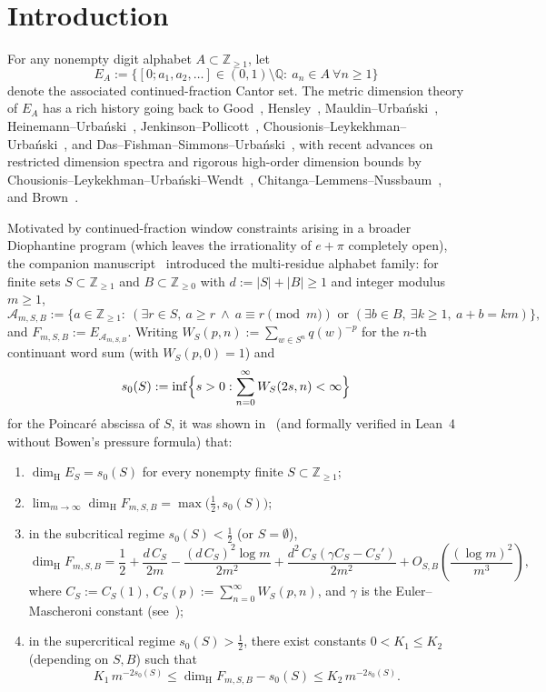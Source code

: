 \documentclass[11pt]{article}
\theoremstyle{definition}
\theoremstyle{remark}
\newcommand{\Z}{\mathbb{Z}}
\newcommand{\Q}{\mathbb{Q}}
\newcommand{\dimH}{\dim_{\mathrm{H}}}
\begin{document}
\section{Introduction}\label{sec:intro}

For any nonempty digit alphabet $A\subset\Z_{\ge1}$, let
\[
E_A:=\bigl\{[0;a_1,a_2,\dots]\in(0,1)\setminus\Q:\ a_n\in A\ \forall n\ge1\bigr\}
\]
denote the associated continued-fraction Cantor set. The metric dimension
theory of $E_A$ has a rich history going back to Good~\cite{Good41},
Hensley~\cite{Hensley92,Hensley1996}, Mauldin--Urba\'nski~\cite{MU96,MU99},
Heinemann--Urba\'nski~\cite{HU02}, Jenkinson--Pollicott~\cite{JP2018},
Chousionis--Leykekhman--Urba\'nski~\cite{CLU}, and
Das--Fishman--Simmons--Urba\'nski~\cite{DFSU}, with recent advances on
restricted dimension spectra and rigorous high-order dimension bounds by
Chousionis--Leykekhman--Urba\'nski--Wendt~\cite{CLUW2024},
Chitanga--Lemmens--Nussbaum~\cite{CLN2026}, and Brown~\cite{Brown2026}.

Motivated by continued-fraction window constraints arising in a broader
Diophantine program (which leaves the irrationality of $e+\pi$ completely
open), the companion manuscript~\cite{Paper2} introduced the multi-residue
alphabet family: for finite sets $S\subset\Z_{\ge1}$ and $B\subset\Z_{\ge0}$
with $d:=|S|+|B|\ge1$ and integer modulus $m\ge1$,
\begin{equation}\label{eq:multi-alphabet}
\mathcal A_{m,S,B}:=\bigl\{a\in\Z_{\ge1}:\ (\exists r\in S,\ a\ge r\ \wedge\ a\equiv r\!\!\pmod m)\text{ or }(\exists b\in B,\ \exists k\ge1,\ a+b=km)\bigr\},
\end{equation}
and $F_{m,S,B}:=E_{\mathcal A_{m,S,B}}$. Writing $W_S(p,n):=\sum_{w\in S^n}q(w)^{-p}$
for the $n$-th continuant word sum (with $W_S(p,0)=1$) and
\[
s_0(S):=\inf\Bigl\{s>0:\sum_{n=0}^\infty W_S(2s,n)<\infty\Bigr\}
\]
for the Poincar\'e abscissa of $S$, it was shown in~\cite{Paper2} (and
formally verified in Lean~4 without Bowen's pressure formula) that:
\begin{enumerate}[label=\textup{(\alph*)},leftmargin=2.2em]
\item $\dimH E_S=s_0(S)$ for every nonempty finite $S\subset\Z_{\ge1}$;
\item $\lim_{m\to\infty}\dimH F_{m,S,B}=\max\bigl(\tfrac12,s_0(S)\bigr)$;
\item in the subcritical regime $s_0(S)<\tfrac12$ (or $S=\emptyset$),
\[
\dimH F_{m,S,B}=\frac12+\frac{d\,C_S}{2m}-\frac{(d\,C_S)^2\log m}{2m^2}
+\frac{d^2\,C_S(\gamma C_S-C_S')}{2m^2}+O_{S,B}\!\left(\frac{(\log m)^2}{m^3}\right),
\]
where $C_S:=C_S(1)$, $C_S(p):=\sum_{n=0}^\infty W_S(p,n)$, and $\gamma$ is the
Euler--Mascheroni constant (see~\cite{DLMF});
\item in the supercritical regime $s_0(S)>\tfrac12$, there exist constants
$0<K_1\le K_2$ (depending on $S,B$) such that
\begin{equation}\label{eq:old-theta}
K_1\,m^{-2s_0(S)}\le \dimH F_{m,S,B}-s_0(S)\le K_2\,m^{-2s_0(S)}.
\end{equation}
\end{enumerate}
\end{document}

